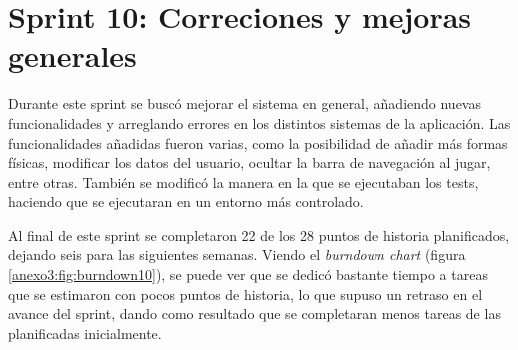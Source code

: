 

\section{Sprint 10: Correciones y mejoras generales}
\label{anexo3:sec:sprint10}

Durante este sprint se buscó mejorar el sistema en general, añadiendo nuevas funcionalidades y
arreglando errores en los distintos sistemas de la aplicación. Las funcionalidades añadidas
fueron varias, como la posibilidad de añadir más formas físicas, modificar los datos del usuario,
ocultar la barra de navegación al jugar, entre otras. También se modificó la manera en la que se
ejecutaban los tests, haciendo que se ejecutaran en un entorno más controlado.

Al final de este sprint se completaron 22 de los 28 puntos de historia planificados, dejando seis
para las siguientes semanas. Viendo el \textit{burndown chart} (figura \ref{anexo3:fig:burndown10}),
se puede ver que se dedicó bastante tiempo a tareas que se estimaron con pocos puntos de historia,
lo que supuso un retraso en el avance del sprint, dando como resultado que se completaran menos tareas
de las planificadas inicialmente.

